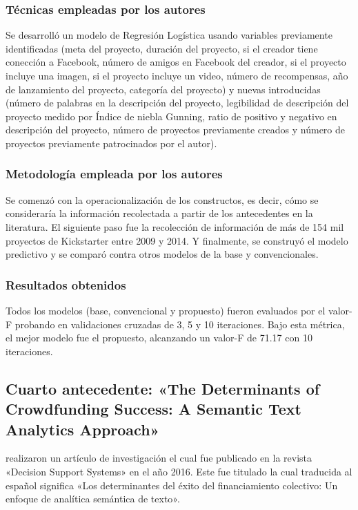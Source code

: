\subsubsection{Técnicas empleadas por los autores}
Se desarrolló un modelo de Regresión Logística usando variables previamente identificadas (meta del proyecto, duración del proyecto, si el creador tiene conección a Facebook, número de amigos en Facebook del creador, si el proyecto incluye una imagen, si el proyecto incluye un video, número de recompensas, año de lanzamiento del proyecto, categoría del proyecto) y nuevas introducidas (número de palabras en la descripción del proyecto, legibilidad de descripción del proyecto medido por Índice de niebla Gunning, ratio de positivo y negativo en descripción del proyecto, número de proyectos previamente creados y número de proyectos previamente patrocinados por el autor).

\subsubsection{Metodología empleada por los autores}
Se comenzó con la operacionalización de los constructos, es decir, cómo se consideraría la información recolectada a partir de los antecedentes en la literatura. El siguiente paso fue la recolección de información de más de 154 mil proyectos de Kickstarter entre 2009 y 2014. Y finalmente, se construyó el modelo predictivo y se comparó contra otros modelos de la base y convencionales.

\subsubsection{Resultados obtenidos}
Todos los modelos (base, convencional y propuesto) fueron evaluados por el valor-F probando en validaciones cruzadas de 3, 5 y 10 iteraciones. Bajo esta métrica, el mejor modelo fue el propuesto, alcanzando un valor-F de 71.17 con 10 iteraciones.


\subsection{Cuarto antecedente: «The Determinants of Crowdfunding Success: A Semantic Text Analytics Approach» \citep*{pr_yuan2016textanalytics}}
\citeauthor{pr_yuan2016textanalytics} realizaron un artículo de investigación el cual fue publicado en la revista «Decision Support Systems» en el año 2016. Este fue titulado  la cual traducida al español significa «Los determinantes del éxito del financiamiento colectivo: Un enfoque de analítica semántica de texto».

